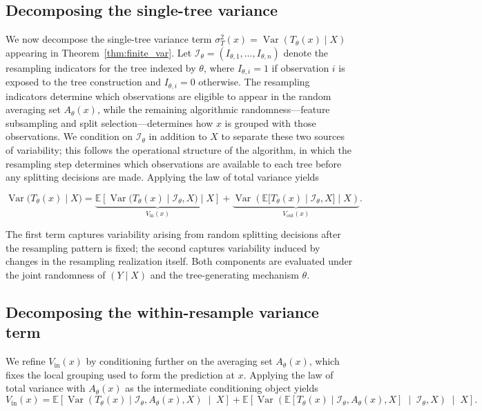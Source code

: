 \documentclass[11pt]{article}
\theoremstyle{plain}
\theoremstyle{definition}
\theoremstyle{remark}
\DeclareMathOperator{\Var}{Var}
\begin{document}
\subsection{Decomposing the single-tree variance}
\label{subsec:single_tree_variance_decomposition}
We now decompose the single-tree variance term $\sigma_T^2(x)=\Var(T_\theta(x)\mid X)$ appearing in Theorem~\ref{thm:finite_var}. Let $\mathcal I_\theta=(I_{\theta,1},\dots,I_{\theta,n})$ denote the resampling indicators for the tree indexed by $\theta$, where $I_{\theta,i}=1$ if observation $i$ is exposed to the tree construction and $I_{\theta,i}=0$ otherwise. The resampling indicators determine which observations are eligible to appear in the random averaging set $A_\theta(x)$, while the remaining algorithmic randomness---feature subsampling and split selection---determines how $x$ is grouped with those observations. We condition on $\mathcal I_\theta$ in addition to $X$ to separate these two sources of variability; this follows the operational structure of the algorithm, in which the resampling step determines which observations are available to each tree before any splitting decisions are made. Applying the law of total variance yields

\begin{equation}
	\label{eq:lotv_sigma}
	\Var\!\bigl(T_\theta(x)\mid X\bigr)
	=
	\underbrace{\mathbb E\!\left[
		\Var\!\bigl(T_\theta(x)\mid \mathcal I_\theta, X\bigr)
		\mid X
		\right]}_{V_{\mathrm{in}}(x)}
	+
	\underbrace{\Var\!\left(
		\mathbb E\!\bigl[T_\theta(x)\mid \mathcal I_\theta, X\bigr]
		\mid X
		\right)}_{V_{\mathrm{out}}(x)}.
\end{equation}

The first term captures variability arising from random splitting decisions after the resampling pattern is fixed; the second captures variability induced by changes in the resampling realization itself. Both components are evaluated under the joint randomness of $(Y\mid X)$ and the tree-generating mechanism $\theta$. 

\subsection{Decomposing the within-resample variance term}
\label{subsec:within_resample_variance}

We refine $V_{\mathrm{in}}(x)$ by conditioning further on the averaging set $A_\theta(x)$, which fixes the local grouping used to form the prediction at $x$. Applying the law of total variance with $A_\theta(x)$ as the intermediate conditioning object yields
\begin{equation}
	\label{eq:lotv_within_resample}
	V_{\mathrm{in}}(x)
	=
	\mathbb E\!\left[
	\Var\!\left(
	T_\theta(x)\mid \mathcal I_\theta, A_\theta(x), X
	\right)
	\;\middle|\;
	X
	\right]
	+
	\mathbb E\!\left[
	\Var\!\left(
	\mathbb E\!\left[T_\theta(x)\mid \mathcal I_\theta, A_\theta(x), X\right]
	\;\middle|\;
	\mathcal I_\theta, X
	\right)
	\;\middle|\;
	X
	\right].
\end{equation}
\end{document}
